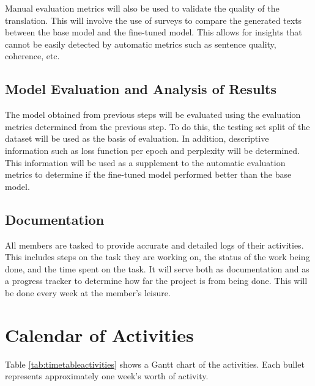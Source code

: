 Manual evaluation metrics will also be used to validate the quality of the translation.
This will involve the use of surveys to compare the generated texts between the base model and the fine-tuned model.
This allows for insights that cannot be easily detected by automatic metrics such as sentence quality, coherence, etc.

\subsection{Model Evaluation and Analysis of Results}
The model obtained from previous steps will be evaluated using the evaluation metrics determined from the previous step.
To do this, the testing set split of the dataset will be used as the basis of evaluation.
In addition, descriptive information such as loss function per epoch and perplexity will be determined.
This information will be used as a supplement to the automatic evaluation metrics to determine if the fine-tuned model performed better than the base model.

\subsection{Documentation}
All members are tasked to provide accurate and detailed logs of their activities.
This includes steps on the task they are working on, the status of the work being done, and the time spent on the task.
It will serve both as documentation and as a progress tracker to determine how far the project is from being done.
This will be done every week at the member’s leisure.


\section{Calendar of Activities}

	Table \ref{tab:timetableactivities} shows a Gantt chart of the activities.  Each bullet represents approximately
	one week's worth of activity.
	
	\newcommand{\weekone}{\textbullet}
	\newcommand{\weektwo}{\textbullet \textbullet}
	\newcommand{\weekthree}{\textbullet \textbullet \textbullet}
	\newcommand{\weekfour}{\textbullet \textbullet \textbullet \textbullet}
	
